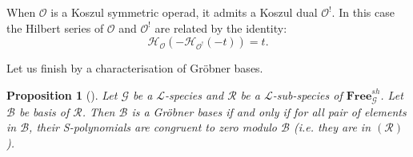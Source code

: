 \documentclass[11pt]{article}
\newtheorem{prop}[theo]{Proposition}
\theoremstyle{definition}
\numberwithin{equation}{section}
\newcommand{\op}[1]{\mathbf{#1}}
\newcommand{\hilbert}[1]{\mathcal{H}_{#1}}
\newcommand{\Operad}{\mathcal{O}}
\newcommand{\free}[1]{\op{Free}_{#1}}
\begin{document}
When $\Operad$ is a Koszul symmetric operad, it admits a Koszul dual $\Operad^!$. In this case the Hilbert series of $\Operad$ and $\Operad^!$ are related by
the identity:
\begin{equation} \label{hdual}
    \hilbert{\Operad}(-\hilbert{\Operad^!}(-t)) = t.
\end{equation}

Let us finish by a characterisation of Gröbner bases.

\begin{prop}[{\cite[Theorem 1]{DK10}}]\label{prop_spol}
    Let $\mathcal{G}$ be a $\mathscr{L}$-species and $\mathcal{R}$ be a $\mathscr{L}$-sub-species of $\free{\mathcal{G}}^{sh}$. Let $\mathcal{B}$ 
    be basis of $\mathcal{R}$. Then $\mathcal{B}$ is a Gröbner bases if and only if for all pair of elements in $\mathcal{B}$, their S-polynomials
    are congruent to zero modulo $\mathcal{B}$ (i.e. they are in $(\mathcal{R})$).
\end{prop}
\end{document}
